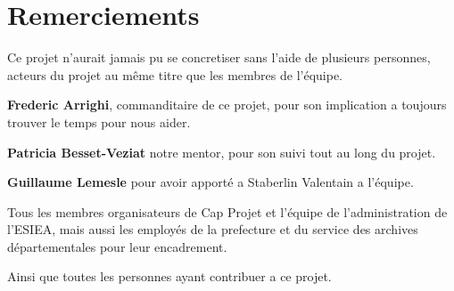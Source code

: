 \section{Remerciements}
Ce projet n'aurait jamais pu se concretiser sans l'aide de plusieurs personnes, acteurs du projet au même titre que les membres de l'équipe.


\textbf{Frederic Arrighi}, commanditaire de ce projet, pour son implication a toujours trouver le temps pour nous aider.

\textbf{Patricia Besset-Veziat} notre mentor, pour son suivi tout au long du projet.

\textbf{Guillaume Lemesle} pour avoir apporté a Staberlin Valentain a l'équipe.

Tous les membres organisateurs de Cap Projet et l'équipe de l'administration de l'ESIEA, mais aussi les employés de la prefecture et du service des archives départementales pour leur encadrement.

Ainsi que toutes les personnes ayant contribuer a ce projet.


